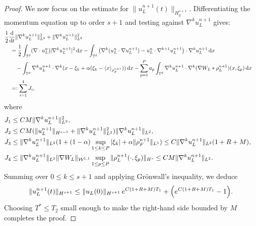 \documentclass[10pt, reqno]{amsart}
\theoremstyle{definition}
\theoremstyle{remark}
\numberwithin{equation}{section}
\newcommand{\dx}{\textnormal{d}x}
\newcommand{\ddt}{\frac{\textnormal{d}}{\textnormal{d}t}}
\newcommand{\calW}{\mathcal W}
\newcommand{\T}{\mathbb{T}}
\begin{document}
\begin{proof}
We now focus on the estimate for $\|u_L^{n+1}(t)\|_{H^{s+1}_g}$. Differentiating the momentum equation up to order $s+1$ and testing against $\nabla^k u_L^{n+1}$ gives:
\begin{align*}
& \frac12\ddt\|\nabla^k u_L^{n+1}\|_{L^2}^2  + \|\nabla^k u_L^{n+1}\|_{L^2}^2 \cr
&\quad  = \frac12\int_{\T^d} (\nabla \cdot  u_L^n)|\nabla^k u_L^{n+1}|^2\,\dx - \int_{\T^d} \left(\nabla^k ( u_L^n \cdot \nabla u_L^{n+1}) - u_L^n \cdot \nabla^{k+1} u_L^{n+1}\right) \cdot \nabla^k u_L^{n+1}\,\dx\cr
 &\qquad - \int_{\T^d} \nabla^k u_L^{n+1} \cdot \nabla^k (x-  \xi_k + \alpha(\xi_k -   \langle x \rangle_{\rho_F^{n+1}}))\,\dx - \sum_{p=1}^P a_p \int_{\T^d}  \nabla^k u_L^{n+1} \cdot \nabla^k (\nabla W_L * \rho_L^{n+1})(x,\xi_p)\,\dx \cr
&\quad =: \sum_{i=1}^4 J_i,
\end{align*}
where
\begin{align*}
J_1 &\leq CM\|\nabla^k u_L^{n+1}\|_{L^2}^2, \cr 
J_2 &\leq CM(\|u_L^{n+1}\|_{H^{s-1}}+\|\nabla^k u_L^{n+1}\|_{L^2}^2)\|\nabla^k u_L^{n+1}\|_{L^2},  \cr
J_3 &\leq \|\nabla^k u_L^{n+1}\|_{L^2}(1 + (1-\alpha)\sup_{1 \leq k \leq P}|\xi_k| + \alpha\|\rho_F^{n+1}\|_{L^1}) \leq C\|\nabla^k u_L^{n+1}\|_{L^2}(1 + R + M), \cr
 J_4 &\leq \|\nabla^k u_L^{n+1}\|_{L^2}\|\nabla W_L\|_{\calW^{1,1}}\sup_{1 \leq p \leq P}\|\rho_L^{n+1}(\cdot, \xi_p)\|_{H^s} \leq CM\|\nabla^k u_L^{n+1}\|_{L^2}.
\end{align*}
Summing over $0\le k\le s+1$ and applying Gr\"onwall's inequality, we deduce
\[
\|u_L^{n+1}(t)\|_{H^{s+1}} \le \|u_L(0)\|_{H^{s+1}}\, e^{C(1+R+M)T_1} + \Bigl(e^{C(1+R+M)T_1}-1\Bigr).
\]
Choosing $T^* \le T_2$ small enough to make the right-hand side bounded by $M$ completes the proof.
\end{proof}    
    
     
 

%
%
%
%
%
%
%
%
%
%
%
%
\end{document}

